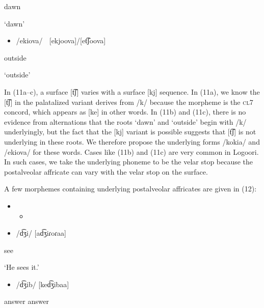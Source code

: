 \documentclass[output=paper]{langsci/langscibook}
\begin{document}
dawn

‘dawn’

\begin{itemize}
\item /ekiova/    [ekjoova]/[et͡ʃoova]

\end{itemize}

outside

‘outside’

In (11a–c), a surface [t͡ʃ] varies with a surface [kj] sequence. In (11a), we know the [t͡ʃ] in the palatalized variant derives from /k/ because the morpheme is the \textsc{cl}7 concord, which appears as [ke] in other words. In (11b) and (11c), there is no evidence from alternations that the roots ‘dawn’ and ‘outside’ begin with /k/ underlyingly, but the fact that the [kj] variant is possible suggests that [t͡ʃ] is not underlying in these roots. We therefore propose the underlying forms /kokia/ and /ekiova/ for these words. Cases like (11b) and (11c) are very common in Logoori. In such cases, we take the underlying phoneme to be the velar stop because the postalveolar affricate can vary with the velar stop on the surface. 

A few morphemes containing underlying postalveolar affricates are given in (12):

\setcounter{itemize}{0}
\begin{itemize}
\item \setcounter{itemize}{0}
\begin{itemize}
\item \end{itemize}
\end{itemize}
\setcounter{itemize}{0}
\begin{itemize}
\item /d͡ʒi/  [ad͡ʒiɾoɾaa]

\end{itemize}

see

\textsc{    ‘}He sees it.’

\begin{itemize}
\item /d͡ʒib/  [ked͡ʒibaa]

\end{itemize}

answer  answer
\end{document}

